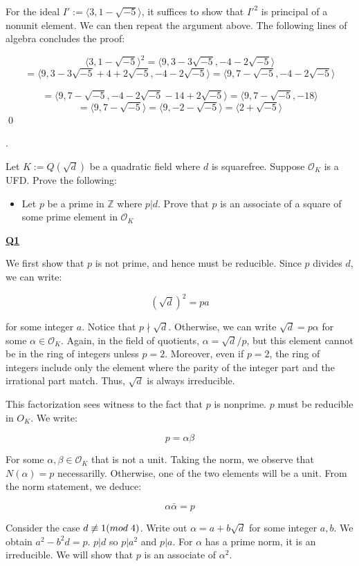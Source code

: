 \documentclass{article}
\newcommand{\new}[1]{
    \vspace{2mm}
    \noindent
    \textbf{
    \underline{#1}}
}
\def\ZZ{{\mathbb{Z}}}
\def\_{{\hspace{1mm}}}
\newcounter{problemcnt}
\newcommand{\Problem}{{
    \vspace{5mm}
    \stepcounter{problemcnt}
    \noindent
    \arabic{problemcnt}. 
}
}
\newcommand{\<}{{
    \langle
}}
\def\>{{
    \rangle
}}
\def\ZZ{{\mathbb{Z}}}
\newcommand{\ringInt}{
    {\mathcal{O}}
}
\begin{document}
\vspace{3mm}
For the ideal $I' := \<3, 1-\sqrt{-5}\>$, it suffices 
to show that $I'^2$ is principal of a nonunit element. 
We can then repeat the argument above. The following 
lines of algebra concludes the proof:


\[
    \<3, 1-\sqrt{-5}\>^2 = \<9, 3-3\sqrt{-5}, -4-2\sqrt{-5}\>
\]\[
    = \<9, 3-3\sqrt{-5} +4 + 2\sqrt{-5}, -4-2\sqrt{-5}\> 
    = \<9, 7-\sqrt{-5}, -4-2\sqrt{-5}\> 
\]

\[
    = \<9, 7-\sqrt{-5}, -4-2\sqrt{-5}-14+2\sqrt{-5}\>
    = \<9, 7-\sqrt{-5}, -18\> 
\]
\[
    = \<9, 7-\sqrt{-5}\> = \<9, -2-\sqrt{-5}\>
    = \<2+\sqrt{-5}\>
\]
\qed


\newpage

\Problem
Let $K:=Q(\sqrt{d})$ be a quadratic field where $d$ is 
squarefree. Suppose $\ringInt_K$ is a UFD. Prove the following:
\begin{itemize}
    \item Let $p$ be a prime in $\ZZ$ where 
    $p|d$. Prove that $p$ 
    is an associate of a square of some prime element 
    in $\ringInt_K$
\end{itemize}

\new{Q1}
We first show that $p$ is not prime, and hence must be reducible. 
Since $p$ divides $d$, we can write:

\[
    (\sqrt{d})^2 = pa
\]

for some integer $a$. Notice that $p \nmid \sqrt{d}$. Otherwise, 
we can write $\sqrt{d} = p\alpha$ for some $\alpha \in \ringInt_K$.
Again, in the field of quotients, $\alpha = \sqrt{d}/p$, but 
this element cannot be in the ring of integers unless $p = 2$.
Moreover, even if $p = 2$, the ring of integers include only the 
element where the parity of the integer part and the irrational part 
match. Thus, $\sqrt{d}$ is always irreducible. 

This factorization sees witness to the fact that 
$p$ is nonprime. $p$ must be reducible in $O_K$. We write:

\[
    p = \alpha \beta
\]

For some $\alpha, \beta \in \ringInt_K$ that is not a unit. 
Taking the norm, we observe that $N(\alpha) = p$ necessarilly. 
Otherwise, one of the two elements will be a unit. From the norm 
statement, we deduce:

\[
    \alpha \bar{\alpha} = p
\]

Consider the case $d \not\equiv 1 (mod \_ 4)$. 
Write out $\alpha  = a+b\sqrt{d}$ for some integer $a, b$. We obtain 
$a^2-b^2d = p$. $p|d$ so $p|a^2$ and $p|a$. For $\alpha$ has a prime norm, it is an irreducible. 
We will show that $p$ is an associate of $\alpha^2$. 
\end{document}
